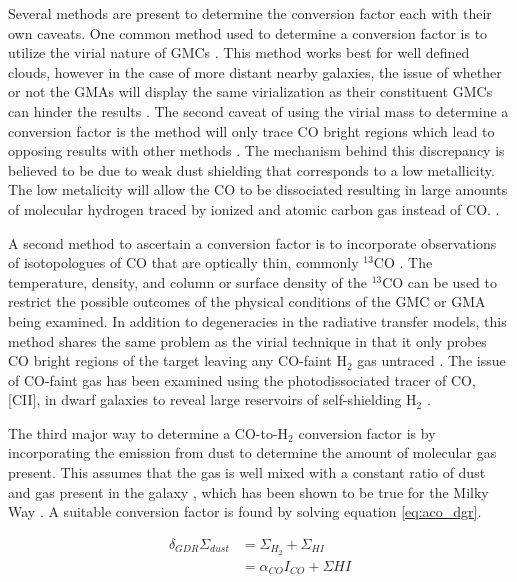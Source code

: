 Several methods are present to determine the conversion factor each with their own caveats.  One common method used to determine a conversion factor is to utilize the virial nature of GMCs \citep{bolatto2013}.  This method works best for well defined clouds, however in the case of more distant nearby galaxies, the issue of whether or not the GMAs will display the same virialization as their constituent GMCs can hinder the results \citep{bolatto2013}.  The second caveat of using the virial mass to determine a conversion factor is the method will only trace CO bright regions which lead to opposing results with other methods \citep{bolatto2013}.  The mechanism behind this discrepancy is believed to be due to weak dust shielding that corresponds to a low metallicity.  The low metalicity will allow the CO to be dissociated resulting in large amounts of molecular hydrogen traced by ionized and atomic carbon gas instead of CO. \citep{bolatto2013}.  %

A second method to ascertain a conversion factor is to incorporate observations of isotopologues of CO that are optically thin, commonly $^{13}$CO \citep{bolatto2013}.   The temperature, density, and column or surface density of the $^{13}$CO can be used to restrict the possible outcomes of the physical conditions of the GMC or GMA being examined.  In addition to degeneracies in the radiative transfer models, this method shares the same problem as the virial technique in that it only probes CO bright regions of the target leaving any CO-faint H$_2$ gas untraced \citep{bolatto2013}.  The issue of CO-faint gas has been examined using the photodissociated tracer of CO, [CII], in dwarf galaxies to reveal large reservoirs of self-shielding H$_2$ \citep{madden1997}.

The third major way to determine a CO-to-H$_2$ conversion factor is by incorporating the emission from dust to determine the amount of molecular gas present.  This assumes that the gas is well mixed with a constant ratio of dust and gas present in the galaxy \citep{leroy2011}, which has been shown to be true for the Milky Way \citep{boulanger1996}.  A suitable conversion factor is found by solving equation \ref{eq:aco_dgr}.

\begin{equation}\label{eq:aco_dgr}
  \begin{split}
    \delta_{GDR}\Sigma_{dust} & = \Sigma_{H_2} + \Sigma_{HI} \\
    						  & = \alpha_{CO} I_{CO} + \Sigma{HI}
  \end{split}
\end{equation}

